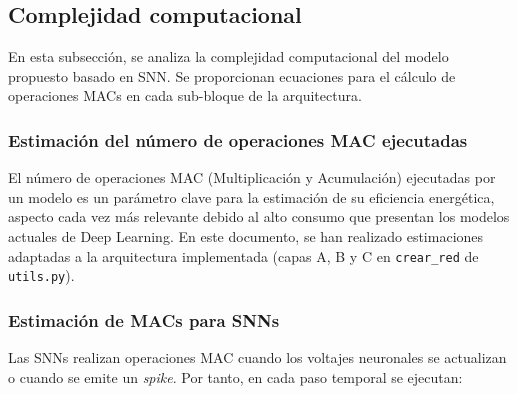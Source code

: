 
    
\subsection{Complejidad computacional}

En esta subsección, se analiza la complejidad computacional del modelo propuesto basado en SNN. Se proporcionan ecuaciones para el cálculo de operaciones MACs en cada sub-bloque de la arquitectura.

\subsubsection{Estimación del número de operaciones MAC ejecutadas}

El número de operaciones MAC (Multiplicación y Acumulación) ejecutadas por un modelo es un parámetro clave para la estimación de su eficiencia energética, aspecto cada vez más relevante debido al alto consumo que presentan los modelos actuales de Deep Learning. En este documento, se han realizado estimaciones adaptadas a la arquitectura implementada (capas A, B y C en \texttt{crear\_red} de \texttt{utils.py}).

\subsubsection{Estimación de MACs para SNNs}

Las SNNs realizan operaciones MAC cuando los voltajes neuronales se actualizan o cuando se emite un \textit{spike}. Por tanto, en cada paso temporal se ejecutan:

